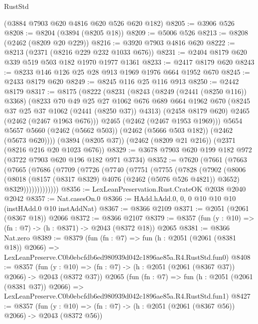 \begin{lexlean}{RustStd}
\begin{coremodule}
    (@3884 @7903 @620 @4816 @620 @526 @620 @182)
@8205 := @3906 @526
@8208 := @8204 (@3894 (@8205 @18))
@8209 := @5006 @526
@8213 := @8208 (@2462 (@8209 @20 @229))
@8216 := @3920 @7903 @4816 @620
@8222 := @8213 (@2371 (@8216 @229 @232 @1033 @676))
@8231 := @2404 @8179 @620 @339 @519 @503 @182 @1970 @1977 @1361
@8233 := @2417 @8179 @620
@8243 := @8233 @146 @126 @25 @28 @913 @1969 @1976 @664 @1952 @670
@8245 := @2433 @8179 @620
@8249 := @8245 @116 @25 @116 @913
@8250 := @2442 @8179
@8317 := @8175
    (@8222
      (@8231
        (@8243
          (@8249 (@2441 (@8250 @116)) @3368)
          (@8233
            @70
            @49
            @25
            @27
            @1062
            @676
            @689
            @664
            @1962
            @670
            (@8245 @37 @25 @37 @1062 (@2441 (@8250 @37)) @4313)
            (@2458 @8179 @620)
            @2465
            (@2462 (@2467 @1963 @676)))
          @2465
          (@2462 (@2467 @1953 @1969)))
        @5654
        @5657
        @5660
        (@2462 (@5662 @503))
        (@2462 (@5666 @503 @182))
        (@2462 (@5673 @620))))
    (@3894 (@8205 @37))
    (@2462 (@8209 @21 @216))
    (@2371 (@8216 @216 @20 @1023 @676))
@8329 := @3678 @7903 @620 @199 @182 @972 (@3722 @7903 @620 @196 @182 @971 @3734)
@8352 := @7620
    (@7661
      (@7663
        (@7665
          (@7686
            (@7709
              (@7726
                (@7740
                  (@7751
                    (@7755
                      (@7828
                        (@7902
                          (@8006
                            (@8018
                              (@8157 (@8317 @8329) @4076 (@2462 (@5076 @526 @4821)) @3652)
                              @8329)))))))))))))
@8356 := LexLeanPreservation.Rust.CrateOK @2038 @2040 @2042
@8357 := Nat.casesOn.{0}
@8366 := HAdd.hAdd.{0, 0, 0} @10 @10 @10 (instHAdd.{0} @10 instAddNat)
@8367 := @8366 @2109
@8371 := @2051 (@2061 (@8367 @18)) @2066
@8372 := @8366 @2107
@8379 := @8357 (fun (y : @10) => (fn : @7) -> (h : @8371) -> @2043 (@8372 @18)) @2065
@8381 := @8366 Nat.zero
@8389 := @8379
    (fun (fn : @7) =>
    fun (h : @2051 (@2061 (@8381 @18)) @2066) =>
    LexLeanPreserve.C0b0ebcfdb6ed980939d042c1896ae85a.R4.RustStd.fun0)
@8408 := @8357
    (fun (y : @10) => (fn : @7) -> (h : @2051 (@2061 (@8367 @37)) @2066) -> @2043 (@8372 @37))
    @2065
    (fun (fn : @7) =>
    fun (h : @2051 (@2061 (@8381 @37)) @2066) =>
    LexLeanPreserve.C0b0ebcfdb6ed980939d042c1896ae85a.R4.RustStd.fun1)
@8427 := @8357
    (fun (y : @10) => (fn : @7) -> (h : @2051 (@2061 (@8367 @56)) @2066) -> @2043 (@8372 @56))

\end{coremodule}
\end{lexlean}
